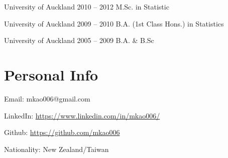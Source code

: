 \documentclass{tccv}
\begin{document}
\begin{yearlist}

\item[University of Auckland]{2010 -- 2012}
     {M.Sc. in Statistic}
{}

\item[University of Auckland]{2009 -- 2010}
     {B.A. (1st Class Hons.) \newline in Statistics}
{}

\item[University of Auckland]{2005 -- 2009}
  {B.A. \& B.Sc}
  {}





    
\end{yearlist}

\section{Personal Info}

\begin{factlist}

\item{Email:}
  {mkao006@gmail.com}

\item{LinkedIn:}
  {\href{https://www.linkedin.com/in/mkao006/}{https://www.linkedin.com/in/mkao006/}}

\item{Github:}
  {\href{https://github.com/mkao006}{https://github.com/mkao006}}

\item{Nationality:}
  {New Zealand/Taiwan}



\end{factlist}
\end{document}

